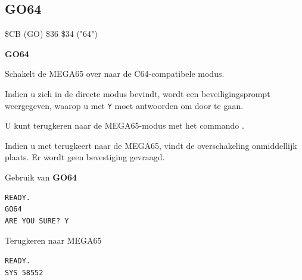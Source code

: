 \subsection{GO64}
\begin{description}[leftmargin=2cm,style=nextline]
\item [Token:]    \$CB (GO) \$36 \$34 ("64")

\item [Formaat:]   {\bf GO64}

\item [Gebruik:]    Schakelt de MEGA65 over naar de C64-compatibele modus.

                  Indien u zich in de directe modus bevindt, wordt een beveiligingsprompt  weergegeven, waarop u met \texttt{Y} moet antwoorden om door te gaan.

                  U kunt terugkeren naar de MEGA65-modus met het commando .

\item [Opmerkingen:]  Indien u met  terugkeert naar de MEGA65, vindt de overschakeling onmiddellijk plaats. Er wordt geen bevestiging gevraagd.

\item [Voorbeeld:]  Gebruik van {\bf GO64}

\begin{tcolorbox}[colback=black,coltext=white]
\verbatimfont{\codefont}
\begin{verbatim}
READY.
GO64
ARE YOU SURE? Y
\end{verbatim}
\end{tcolorbox}

                  Terugkeren naar MEGA65

\begin{tcolorbox}[colback=black,coltext=white]
\verbatimfont{\codefont}
\begin{verbatim}
READY.
SYS 58552
\end{verbatim}
\end{tcolorbox}
\end{description}


\newpage
